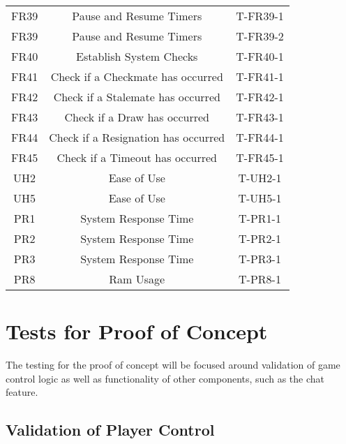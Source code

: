 \documentclass[12pt, titlepage]{article}
\begin{document}
\begin{center}
\begin{longtable}{ |c|c|c| }
        \hline
        FR39    & Pause and Resume Timers               & T-FR39-1 \\ 
        FR39    & Pause and Resume Timers               & T-FR39-2 \\ 
        \hline
        FR40    & Establish System Checks               & T-FR40-1 \\ 
        \hline
        FR41    & Check if a Checkmate has occurred     & T-FR41-1 \\
        \hline
        FR42    & Check if a Stalemate has occurred     & T-FR42-1 \\
        \hline
        FR43    & Check if a Draw has occurred          & T-FR43-1 \\ 
        \hline
        FR44    & Check if a Resignation has occurred   & T-FR44-1 \\
        \hline
        FR45    & Check if a Timeout has occurred       & T-FR45-1 \\
        \hline
        UH2     & Ease of Use                           & T-UH2-1 \\ 
        \hline
        UH5     & Ease of Use                           & T-UH5-1 \\ 
        \hline
        PR1     & System Response Time                  & T-PR1-1 \\ 
        \hline
        PR2     & System Response Time                  & T-PR2-1 \\ 
        \hline
        PR3     & System Response Time                  & T-PR3-1 \\ 
        \hline
        PR8     & Ram Usage                             & T-PR8-1 \\ 
        \hline
    \end{longtable}
\end{center}
\section{Tests for Proof of Concept}

The testing for the proof of concept will be focused around validation of game control logic as well as functionality of other components, such as the chat feature.

\subsection{Validation of Player Control}
\end{document}
